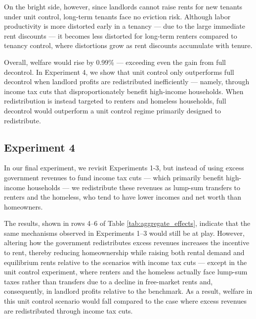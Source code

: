 \documentclass[parskip=full]{article}
\begin{document}
On the bright side, however, since landlords cannot raise rents for new tenants under unit control, long-term tenants face no eviction risk. Although labor productivity is more distorted early in a tenancy — due to the large immediate rent discounts — it becomes less distorted for long-term renters compared to tenancy control, where distortions grow as rent discounts accumulate with tenure.

Overall, welfare would rise by 0.99\% — exceeding even the gain from full decontrol. In Experiment 4, we show that unit control only outperforms full decontrol when landlord profits are redistributed inefficiently — namely, through income tax cuts that disproportionately benefit high-income households. When redistribution is instead targeted to renters and homeless households, full decontrol would outperform a unit control regime primarily designed to redistribute.

\subsection{Experiment 4}\label{sec:exp_4}

In our final experiment, we revisit Experiments 1-3, but instead of using excess government revenues to fund income tax cuts — which primarily benefit high-income households — we redistribute these revenues as lump-sum transfers to renters and the homeless, who tend to have lower incomes and net worth than homeowners.

The results, shown in rows 4–6 of Table \ref{tab:aggregate_effects}, indicate that the same mechanisms observed in Experiments 1–3 would still be at play. However, altering how the government redistributes excess revenues increases the incentive to rent, thereby reducing homeownership while raising both rental demand and equilibrium rents relative to the scenarios with income tax cuts — except in the unit control experiment, where renters and the homeless actually face lump-sum taxes rather than transfers due to a decline in free-market rents and, consequently, in landlord profits relative to the benchmark. As a result, welfare in this unit control scenario would fall compared to the case where excess revenues are redistributed through income tax cuts.
\end{document}

